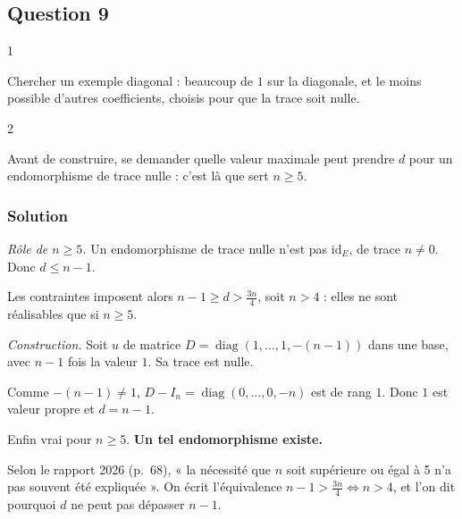 \documentclass[11pt,a4paper]{article}
\newcommand{\equationajustee}[1]{%
  \sbox{\boiteequation}{$\displaystyle #1$}%
  \ifdim\wd\boiteequation>\linewidth
    \[\resizebox{\linewidth}{!}{\usebox{\boiteequation}}\]%
  \else
    \[#1\]%
  \fi}
\begin{document}
\hypertarget{question-9}{%
\subsection{Question 9}\label{question-9}}

\begin{indication}{1}

Chercher un exemple diagonal : beaucoup de \(1\) sur la diagonale, et le moins possible d'autres coefficients, choisis pour que la trace soit nulle.

\end{indication}

\begin{indication}{2}

Avant de construire, se demander quelle valeur maximale peut prendre \(d\) pour un endomorphisme de trace nulle : c'est là que sert \(n\ge5\).

\end{indication}

\hypertarget{solution-8}{%
\subsubsection{Solution}\label{solution-8}}

\emph{Rôle de \(n\ge5\).} Un endomorphisme de trace nulle n'est pas \({\mathrm{id}}_E\), de trace \(n\neq0\). Donc \(d\le n-1\).

Les contraintes imposent alors \(n-1\ge d>\frac{3n}4\), soit \(n>4\) : elles ne sont réalisables que si \(n\ge5\).

\emph{Construction.} Soit \(u\) de matrice \(D=\operatorname{diag}(1,\dots,1,-(n-1))\) dans une base, avec \(n-1\) fois la valeur \(1\). Sa trace est nulle.

Comme \(-(n-1)\neq1\), \(D-I_n=\operatorname{diag}(0,\dots,0,-n)\) est de rang \(1\). Donc \(1\) est valeur propre et \(d=n-1\).

Enfin
\equationajustee{n-1>\frac{3n}4\iff n>4,}
vrai pour \(n\ge5\). \textbf{Un tel endomorphisme existe.}

\begin{jury}

Selon le rapport 2026 (p.~68), « la nécessité que \(n\) soit supérieure ou égal à 5 n'a pas souvent été expliquée ». On écrit l'équivalence \(n-1>\frac{3n}4\iff n>4\), et l'on dit pourquoi \(d\) ne peut pas dépasser \(n-1\).

\end{jury}
\end{document}
